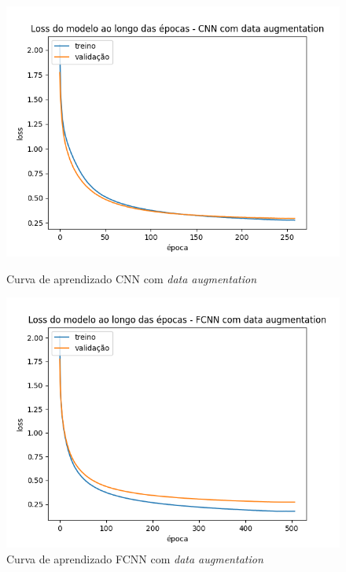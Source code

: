 \documentclass[12pt]{article}
\begin{document}
\begin{figure}[H]
  \centering
  \begin{minipage}{0.5\textwidth}
    \centering
    \includegraphics[width=\textwidth]{../images/results_plt/cnn_com_data_augmentation_loss_progress.png}
    \caption{Curva de aprendizado CNN com \textit{data augmentation}}
    \label{fig:cnn_com_data_augmentation_loss_progress}
  \end{minipage}%
  \hfill
  \begin{minipage}{0.5\textwidth}
    \centering
    \includegraphics[width=\textwidth]{../images/results_plt/fcnn_com_data_augmentation_loss_progress.png}
    \caption{Curva de aprendizado FCNN com \textit{data augmentation}}
    \label{fig:fcnn_com_data_augmentation_loss_progress}
  \end{minipage}
\end{figure}
\end{document}
